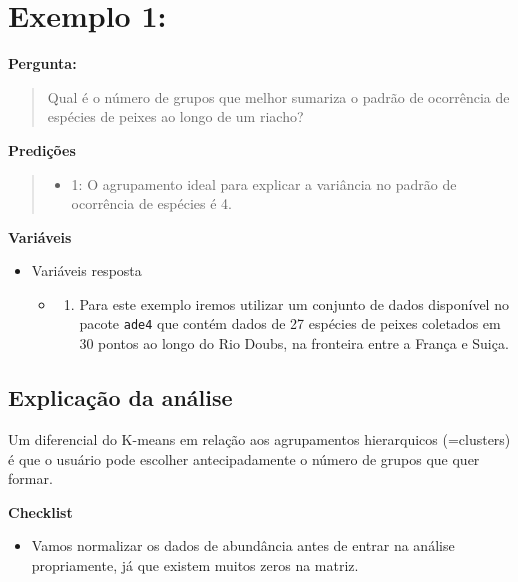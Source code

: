 \documentclass[
]{book}
\providecommand{\tightlist}{%
  \setlength{\itemsep}{0pt}\setlength{\parskip}{0pt}}
\begin{document}
\hypertarget{exemplo-1-1}{%
\section{Exemplo 1:}\label{exemplo-1-1}}

\textbf{Pergunta:}

\begin{quote}
Qual é o número de grupos que melhor sumariza o padrão de ocorrência de espécies de peixes ao longo de um riacho?
\end{quote}

\textbf{Predições}

\begin{quote}
\begin{itemize}
\tightlist
\item
  1: O agrupamento ideal para explicar a variância no padrão de ocorrência de espécies é 4.
\end{itemize}
\end{quote}

\textbf{Variáveis}

\begin{itemize}
\tightlist
\item
  Variáveis resposta

  \begin{itemize}
  \item
    \begin{enumerate}
    \def\labelenumi{\arabic{enumi}.}
    \tightlist
    \item
      Para este exemplo iremos utilizar um conjunto de dados disponível no pacote \texttt{ade4} que contém dados de 27 espécies de peixes coletados em 30 pontos ao longo do Rio Doubs, na fronteira entre a França e Suiça.
    \end{enumerate}
  \end{itemize}
\end{itemize}

\hypertarget{explicauxe7uxe3o-da-anuxe1lise-1}{%
\subsection{Explicação da análise}\label{explicauxe7uxe3o-da-anuxe1lise-1}}

Um diferencial do K-means em relação aos agrupamentos hierarquicos (=clusters) é que o usuário pode escolher antecipadamente o número de grupos que quer formar.

\textbf{Checklist}

\begin{itemize}
\tightlist
\item
  Vamos normalizar os dados de abundância antes de entrar na análise propriamente, já que existem muitos zeros na matriz.
\end{itemize}
\end{document}
